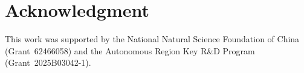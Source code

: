 \documentclass[conference,letterpaper]{IEEEtran}
\begin{document}
\section*{Acknowledgment}
This work was supported by the National Natural Science Foundation of China (Grant~62466058) and the Autonomous Region Key R\&D Program (Grant~2025B03042-1).

\renewcommand{\IEEEbibitemsep}{2.0pt}
\newcommand{\BIBdecl}{\fussy\rightskip=0pt plus 0.65em\relax\setlength{\emergencystretch}{1.5em}}
\balance


\end{document}
